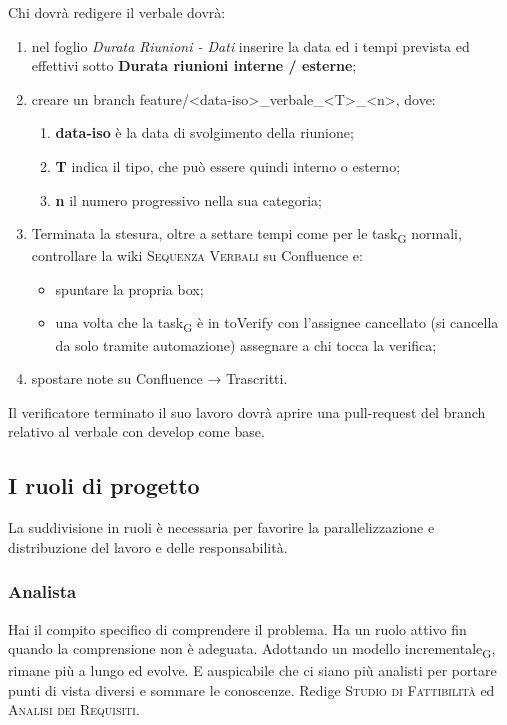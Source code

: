     	Chi dovrà redigere il verbale dovrà:
    	\begin{enumerate}
    		\item nel foglio \textit{Durata Riunioni - Dati} inserire la data ed i tempi prevista ed effettivi  sotto \textbf{Durata riunioni interne / esterne};
    		\item creare un branch feature/<data-iso>\_verbale\_<T>\_<n>, dove:
            \begin{enumerate}
                \item \textbf{data-iso} è la data di svolgimento della riunione;
                \item \textbf{T} indica il tipo, che può essere quindi interno o esterno;
                \item \textbf{n} il numero progressivo nella sua categoria;
            \end{enumerate}
    		\item Terminata la stesura, oltre a settare tempi come per le task\textsubscript{G} normali, controllare la wiki \textsc{Sequenza Verbali} su Confluence e:
    		\begin{itemize}
    			\item spuntare la propria box;
    			\item una volta che la task\textsubscript{G} è in toVerify con l’assignee cancellato (si cancella da solo tramite automazione) assegnare a chi tocca la verifica;
    		\end{itemize}
    		\item spostare note su Confluence → Trascritti.
    	\end{enumerate}
        Il verificatore terminato il suo lavoro dovrà aprire una pull-request del branch relativo al verbale con develop come base.

\subsection{I ruoli di progetto}
    La suddivisione in ruoli è necessaria per favorire la parallelizzazione e distribuzione del lavoro e delle responsabilità.
    \subsubsection{Analista}
    Hai il compito specifico di comprendere il problema. Ha un ruolo attivo fin quando la comprensione non è adeguata. Adottando un modello incrementale\textsubscript{G}, rimane più a lungo ed evolve. E auspicabile che ci siano più analisti per portare punti di vista diversi e sommare le conoscenze. Redige \textsc{Studio di Fattibilità} ed \textsc{Analisi dei Requisiti}.
